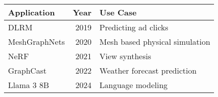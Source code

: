 \begin{tabular}{lrl}
\hline
\textbf{Application} & \multicolumn{1}{l}{\textbf{Year}} & \textbf{Use Case}      \\ \hline
DLRM                 & 2019   & Predicting ad clicks  \\
MeshGraphNets        & 2020   & Mesh based physical simulation     \\
NeRF                 & 2021   & View synthesis     \\
GraphCast            & 2022   & Weather forecast prediction      \\ 
Llama 3 8B           & 2024   & Language modeling \\ \hline
\end{tabular}